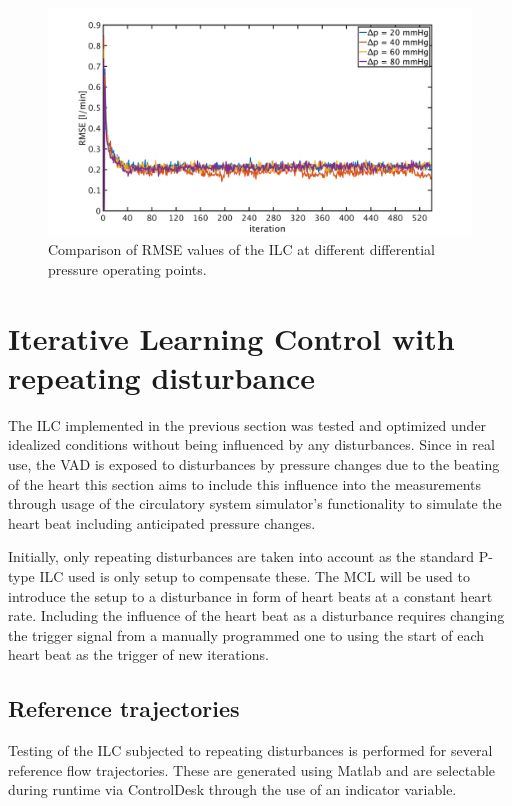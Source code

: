 \begin{figure}[ht]
  \centering
  \includegraphics[width=\textwidth]{images/chapt_5/ILC/RMSE_compare_operating_points.pdf}
  \caption[Comparison of RMSE values of the ILC at different differential pressure operating points]{Comparison of RMSE values of the ILC at different differential pressure operating points.}
  \label{fig:RMSE_compare_operating_points}
\end{figure}
\section{Iterative Learning Control with repeating disturbance}

The ILC implemented in the previous section was tested and optimized under idealized conditions without being influenced by any disturbances. Since in real use, the VAD is exposed to disturbances by pressure changes due to the beating of the heart this section aims to include this influence into the measurements through usage of the circulatory system simulator's functionality to simulate the heart beat including anticipated pressure changes.

Initially, only repeating disturbances are taken into account as the standard P-type ILC used is only setup to compensate these.
The MCL will be used to introduce the setup to a disturbance in form of heart beats at a constant heart rate. Including the influence of the heart beat as a disturbance requires changing the trigger signal from a manually programmed one to using the start of each heart beat as the trigger of new iterations.
\subsection{Reference trajectories}
Testing of the ILC subjected to repeating disturbances is performed for several reference flow trajectories. These are generated using Matlab and are selectable during runtime via ControlDesk through the use of an indicator variable.


